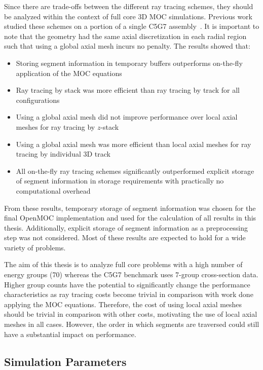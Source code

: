 Since there are trade-offs between the different ray tracing schemes, they should be analyzed within the context of full core 3D \ac{MOC} simulations. Previous work studied these schemes on a portion of a single C5G7 assembly~\cite{physor2016otf}. It is important to note that the geometry had the same axial discretization in each radial region such that using a global axial mesh incurs no penalty. The results showed that:
\begin{itemize}
	\item Storing segment information in temporary buffers outperforms on-the-fly application of the \ac{MOC} equations
	\item Ray tracing by stack was more efficient than ray tracing by track for all configurations
	\item Using a global axial mesh did not improve performance over local axial meshes for ray tracing by $z$-stack
	\item Using a global axial mesh was more efficient than local axial meshes for ray tracing by individual 3D track
	\item All on-the-fly ray tracing schemes significantly outperformed explicit storage of segment information in storage requirements with practically no computational overhead
\end{itemize}

From these results, temporary storage of segment information was chosen for the final OpenMOC implementation and used for the calculation of all results in this thesis. Additionally, explicit storage of segment information as a preprocessing step was not considered. Most of these results are expected to hold for a wide variety of problems.

The aim of this thesis is to analyze full core problems with a high number of energy groups (70) whereas the C5G7 benchmark uses 7-group cross-section data. Higher group counts have the potential to significantly change the performance characteristics as ray tracing costs become trivial in comparison with work done applying the \ac{MOC} equations. Therefore, the cost of using local axial meshes should be trivial in comparison with other costs, motivating the use of local axial meshes in all cases. However, the order in which segments are traversed could still have a substantial impact on performance. 

\subsection{Simulation Parameters}

